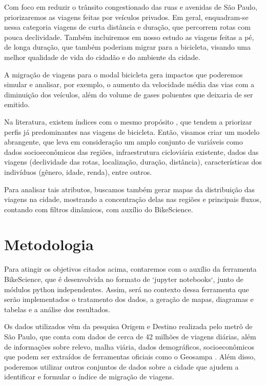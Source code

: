 \documentclass[a4paper]{article}
\begin{document}
Com foco em reduzir o trânsito congestionado das ruas e avenidas de São Paulo, priorizaremos as viagens feitas por veículos privados. Em geral, enquadram-se nessa categoria viagens de curta distância e duração, que percorrem rotas com pouca declividade. Também incluiremos em nosso estudo as viagens feitas a pé, de longa duração, que também poderiam migrar para a bicicleta, visando uma melhor qualidade de vida do cidadão e do ambiente da cidade.

A migração de viagens para o modal bicicleta gera impactos que poderemos simular e analisar, por exemplo, o aumento da velocidade média das vias com a diminuição dos veículos, além do volume de gases poluentes que deixaria de ser emitido.

Na literatura, existem índices com o mesmo propósito \cite{londonindex} \cite{steer}, que tendem a priorizar perfis já predominantes nas viagens de bicicleta. Então, visamos criar um modelo abrangente, que leva em consideração um amplo conjunto de variáveis como dados socioeconômicos das regiões, infraestrutura cicloviária existente, dados das viagens (declividade das rotas, localização, duração, distância), características dos indivíduos (gênero, idade, renda), entre outros.

Para analisar tais atributos, buscamos também gerar mapas da distribuição das viagens na cidade, mostrando a concentração delas nas regiões e principais fluxos, contando com filtros dinâmicos, com auxílio do BikeScience.  

\section*{Metodologia}

Para atingir os objetivos citados acima, contaremos com o auxílio da ferramenta BikeScience, que é desenvolvida no formato de `jupyter notebooks`, junto de módulos python independentes. Assim, será no contexto dessa ferramenta que serão implementados o tratamento dos dados, a geração de mapas, diagramas e tabelas e a análise dos resultados.  

Os dados utilizados vêm da pesquisa Origem e Destino realizada pelo metrô de São Paulo, que conta com dados de cerca de 42 milhões de viagens diárias, além de informações sobre relevo, malha viária, dados demográficos, socioeconômicos que podem ser extraídos de ferramentas oficiais como o Geosampa \cite{geosampa}. Além disso, poderemos utilizar outros conjuntos de dados sobre a cidade que ajudem a identificar e formular o índice de migração de viagens.
\end{document}

